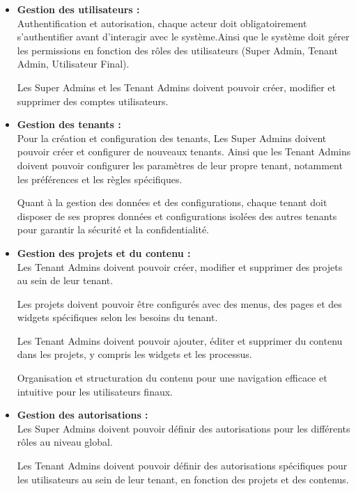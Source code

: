 \begin{itemize}
  \item \textbf{Gestion des utilisateurs :}\\
        Authentification et autorisation, chaque acteur doit obligatoirement s'authentifier avant d'interagir avec le système.Ainsi que le système doit gérer les permissions en fonction des rôles des utilisateurs (Super Admin, Tenant Admin, Utilisateur Final).


        Les Super Admins et les Tenant Admins doivent pouvoir créer, modifier et supprimer des comptes utilisateurs.

  \item \textbf{Gestion des tenants :}\\
        Pour la création et configuration des tenants, Les Super Admins doivent pouvoir créer et configurer de nouveaux tenants. Ainsi que les Tenant Admins doivent pouvoir configurer les paramètres de leur propre tenant, notamment les préférences et les règles spécifiques.

        Quant à la gestion des données et des configurations, chaque tenant doit disposer de ses propres données et configurations isolées des autres tenants pour garantir la sécurité et la confidentialité.

  \item \textbf{Gestion des projets et du contenu :}\\
        Les Tenant Admins doivent pouvoir créer, modifier et supprimer des projets au sein de leur tenant.

        Les projets doivent pouvoir être configurés avec des menus, des pages et des widgets spécifiques selon les besoins du tenant.

        Les Tenant Admins doivent pouvoir ajouter, éditer et supprimer du contenu dans les projets, y compris les widgets et les processus.

        Organisation et structuration du contenu pour une navigation efficace et intuitive pour les utilisateurs finaux.

  \item \textbf{Gestion des autorisations :}\\
        Les Super Admins doivent pouvoir définir des autorisations pour les différents rôles au niveau global.

        Les Tenant Admins doivent pouvoir définir des autorisations spécifiques pour les utilisateurs au sein de leur tenant, en fonction des projets et des contenus.


\end{itemize}
